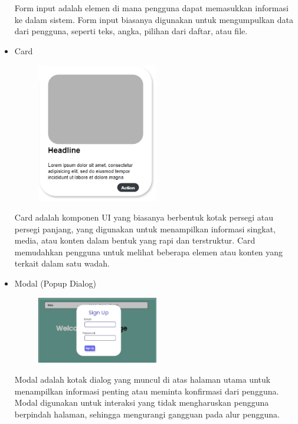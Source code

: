 \documentclass[12pt]{article}
\begin{document}
\begin{itemize}
    Form input adalah elemen di mana pengguna dapat memasukkan informasi ke dalam sistem. Form input biasanya digunakan untuk mengumpulkan data dari pengguna, seperti teks, angka, pilihan dari daftar, atau file.

    \item Card
\begin{figure}[h] %
    \centering
    \includegraphics[width=0.5\textwidth]{asset/card.png }
\end{figure}

    Card adalah komponen UI yang biasanya berbentuk kotak persegi atau persegi panjang, yang digunakan untuk menampilkan informasi singkat, media, atau konten dalam bentuk yang rapi dan terstruktur. Card memudahkan pengguna untuk melihat beberapa elemen atau konten yang terkait dalam satu wadah.

    \item Modal (Popup Dialog)
\begin{figure}[h] %
    \centering
    \includegraphics[width=0.5\textwidth]{asset/popUp.png }
\end{figure}

    Modal adalah kotak dialog yang muncul di atas halaman utama untuk menampilkan informasi penting atau meminta konfirmasi dari pengguna. Modal digunakan untuk interaksi yang tidak mengharuskan pengguna berpindah halaman, sehingga mengurangi gangguan pada alur pengguna.


\end{itemize}
\end{document}
